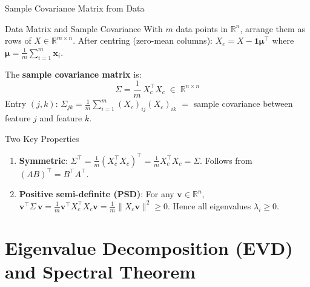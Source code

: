 \documentclass{beamer}
\begin{document}
\begin{frame}[shrink=10]{Sample Covariance Matrix from Data}
  \begin{block}{Data Matrix and Sample Covariance}
    With $m$ data points in $\mathbb{R}^n$, arrange them as rows of
    $X \in \mathbb{R}^{m \times n}$.
    After centring (zero-mean columns):
    $X_c = X - \mathbf{1}\boldsymbol{\mu}^\top$
    where $\boldsymbol{\mu} = \frac{1}{m}\sum_{i=1}^m \mathbf{x}_i$.

    \medskip

    The \textbf{sample covariance matrix} is:
    \[
      \boxed{
        \Sigma
          = \frac{1}{m}\,X_c^\top X_c
          \;\in\; \mathbb{R}^{n \times n}
      }
    \]
    Entry $(j,k)$:
    $\Sigma_{jk}
       = \frac{1}{m}\sum_{i=1}^{m}(X_c)_{ij}(X_c)_{ik}$
    $=$ sample covariance between feature $j$ and feature $k$.
  \end{block}

  \begin{exampleblock}{Two Key Properties}
    \begin{enumerate}\setlength\itemsep{5pt}
      \item \textbf{Symmetric}: $\Sigma^\top = \frac{1}{m}(X_c^\top X_c)^\top
            = \frac{1}{m}X_c^\top X_c = \Sigma$.\quad
            Follows from $(AB)^\top = B^\top A^\top$.
      \item \textbf{Positive semi-definite (PSD)}:
            For any $\mathbf{v} \in \mathbb{R}^n$,\;
            $\mathbf{v}^\top \Sigma\, \mathbf{v}
             = \frac{1}{m}\mathbf{v}^\top X_c^\top X_c\mathbf{v}
             = \frac{1}{m}\|X_c\mathbf{v}\|^2 \geq 0$.
            Hence all eigenvalues $\lambda_i \geq 0$.
    \end{enumerate}
  \end{exampleblock}
\end{frame}

\section{Eigenvalue Decomposition (EVD) and Spectral Theorem}
\end{document}
